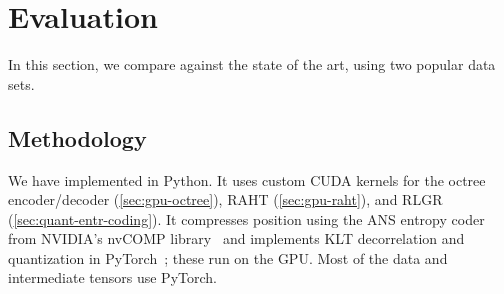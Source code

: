 \section{Evaluation}\label{sec:evaluation}

In this section, we compare \gsnfs{} against the state of the art, using two popular \dgs{} data sets.

\subsection{Methodology}\label{sec:methodology}


%
We have implemented \gsnfs{} in Python.
%
It uses custom CUDA kernels for the octree encoder/decoder (\cref{sec:gpu-octree}), RAHT (\cref{sec:gpu-raht}), and RLGR  (\cref{sec:quant-entr-coding}).
%
It compresses position using the ANS entropy coder from NVIDIA's nvCOMP library~\cite{nvidia_nvcomp} and implements KLT decorrelation and quantization in PyTorch~\cite{pytorch}; these run on the GPU.
%
Most of the data and intermediate tensors use PyTorch.
%
%
%

